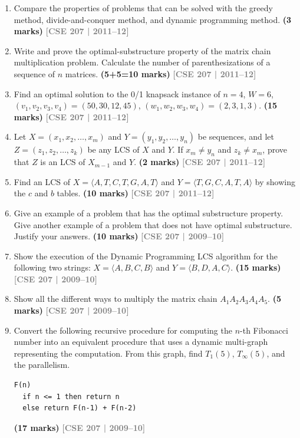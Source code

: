 \documentclass[12pt,a3paper]{article}
\newcommand{\yr}[1]{\hfill\textcolor{gray}{\small\textbf{[#1]}}}
\newcommand{\mk}[1]{\textcolor{orange!70!black}{\small\textbf{(#1 marks)}}}
\begin{document}
\begin{enumerate}
\item Compare the properties of problems that can be solved with the greedy method, divide-and-conquer method, and dynamic programming method. \mk{3}
\yr{CSE 207 | 2011--12}

\item Write and prove the optimal-substructure property of the matrix chain multiplication problem. Calculate the number of parenthesizations of a sequence of $n$ matrices. \mk{5+5=10}
\yr{CSE 207 | 2011--12}

\item Find an optimal solution to the 0/1 knapsack instance of $n = 4$,
$W = 6$, $(v_1,v_2,v_3,v_4)=(50,30,12,45)$,
$(w_1,w_2,w_3,w_4)=(2,3,1,3)$. \mk{15}
\yr{CSE 207 | 2011--12}

\item Let $X = (x_1, x_2, \ldots, x_m)$ and $Y = (y_1, y_2, \ldots, y_n)$ be sequences, and let $Z = (z_1, z_2, \ldots, z_k)$ be any LCS of $X$ and $Y$. If $x_m \neq y_n$ and $z_k \neq x_m$, prove that $Z$ is an LCS of $X_{m-1}$ and $Y$. \mk{2}
\yr{CSE 207 | 2011--12}

\item Find an LCS of $X = \langle A,T,C,T,G,A,T \rangle$ and $Y = \langle T,G,C,A,T,A \rangle$ by showing the $c$ and $b$ tables. \mk{10}
\yr{CSE 207 | 2011--12}

\item Give an example of a problem that has the optimal substructure property. Give another example of a problem that does not have optimal substructure. Justify your answers. \mk{10}
\yr{CSE 207 | 2009--10}

\item Show the execution of the Dynamic Programming LCS algorithm for the following two strings: $X = \langle A,B,C,B \rangle$ and $Y = \langle B,D,A,C \rangle$. \mk{15}
\yr{CSE 207 | 2009--10}

\item Show all the different ways to multiply the matrix chain $A_1 A_2 A_3 A_4 A_5$. \mk{5}
\yr{CSE 207 | 2009--10}

\item Convert the following recursive procedure for computing the $n$-th Fibonacci number into an equivalent procedure that uses a dynamic multi-graph representing the computation. From this graph, find $T_1(5)$, $T_\infty(5)$, and the parallelism.
\begin{verbatim}
F(n)
  if n <= 1 then return n
  else return F(n-1) + F(n-2)
\end{verbatim}
\mk{17}
\yr{CSE 207 | 2009--10}


\end{enumerate}
\end{document}
